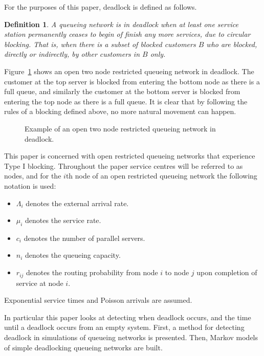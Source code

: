 \documentclass{article}
\newtheorem{definition}{Definition}
\numberwithin{equation}{section}
\begin{document}
For the purposes of this paper, deadlock is defined as follows.\\

\begin{definition}
    A queueing network is in deadlock when at least one service station
    permanently ceases to begin of finish any more services, due to circular
    blocking.
    That is, when there is a subset of blocked customers $B$ who are blocked,
    directly or indirectly, by other customers in $B$ only.
\end{definition}


Figure~\ref{fig:1st_example} shows an open two node restricted queueing
network in deadlock.
The customer at the top server is blocked from entering the bottom node as
there is a full queue, and similarly the customer at the bottom server is
blocked from entering the top node as there is a full queue.
It is clear that by following the rules of a blocking defined above, no more
natural movement can happen.

\begin{figure}[!htbp]
  \begin{center}
  
  \end{center}
  \caption{Example of an open two node restricted queueing network in deadlock.}
  \label{fig:1st_example}
\end{figure}

This paper is concerned with open restricted queueing networks that experience
Type I blocking.
Throughout the paper service centres will be referred to as nodes, and for the
$i$th node of an open restricted queueing network the following notation is
used:

\begin{itemize}
  \item $\Lambda_i$ denotes the external arrival rate.
  \item $\mu_i$ denotes the service rate.
  \item $c_i$ denotes the number of parallel servers.
  \item $n_i$ denotes the queueing capacity.
  \item $r_{ij}$ denotes the routing probability from node $i$ to node $j$
  upon completion of service at node $i$.
\end{itemize}

Exponential service times and Poisson arrivals are assumed.

In particular this paper looks at detecting when deadlock occurs, and the time
until a deadlock occurs from an empty system.
First, a method for detecting deadlock in simulations of queueing networks is
presented.
Then, Markov models of simple deadlocking queueing networks are built.
\end{document}

